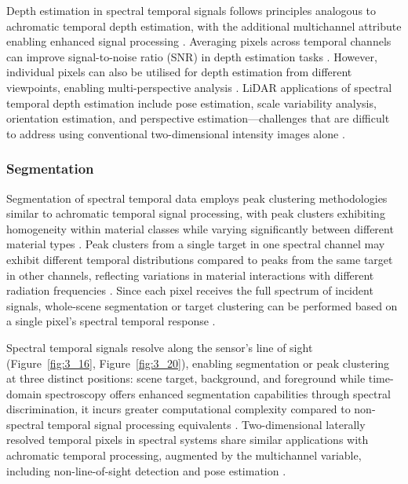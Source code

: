 \documentclass[12pt,a4paper,oneside]{report}
\begin{document}
Depth estimation in spectral temporal signals follows principles analogous to achromatic temporal depth estimation, with the additional multichannel attribute enabling enhanced signal processing \cite{koerner2021}. Averaging pixels across temporal channels can improve signal-to-noise ratio (SNR) in depth estimation tasks \cite{koerner2021}. However, individual pixels can also be utilised for depth estimation from different viewpoints, enabling multi-perspective analysis \cite{moramartin2021}. LiDAR applications of spectral temporal depth estimation include pose estimation, scale variability analysis, orientation estimation, and perspective estimation—challenges that are difficult to address using conventional two-dimensional intensity images alone \cite{moramartin2021,yang2024}.

\subsubsection{Segmentation}
\label{subsubsec:spectral_temporal_segmentation}

Segmentation of spectral temporal data employs peak clustering methodologies similar to achromatic temporal signal processing, with peak clusters exhibiting homogeneity within material classes while varying significantly between different material types \cite{su2016,becker2023}. Peak clusters from a single target in one spectral channel may exhibit different temporal distributions compared to peaks from the same target in other channels, reflecting variations in material interactions with different radiation frequencies \cite{inagaki2020,su2016}. Since each pixel receives the full spectrum of incident signals, whole-scene segmentation or target clustering can be performed based on a single pixel's spectral temporal response .

Spectral temporal signals resolve along the sensor's line of sight (Figure~\ref{fig:3_16}, Figure~\ref{fig:3_20}), enabling segmentation or peak clustering at three distinct positions: scene target, background, and foreground while time-domain spectroscopy offers enhanced segmentation capabilities through spectral discrimination, it incurs greater computational complexity compared to non-spectral temporal signal processing equivalents \cite{inagaki2020,heinz2001}. Two-dimensional laterally resolved temporal pixels in spectral systems share similar applications with achromatic temporal processing, augmented by the multichannel variable, including non-line-of-sight detection and pose estimation \cite{moramartin2021,lyons2019}.
\end{document}
